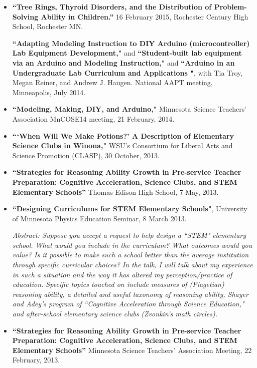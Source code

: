 \documentclass[margin,line,letterpaper]{res}
\begin{document}
\begin{resume}
\begin{itemize}
\item
\textbf{``Tree Rings, Thyroid Disorders, and the Distribution of Problem-Solving Ability in Children.''}
16 February 2015, Rochester Century High School, Rochester MN.

\textbf{``Adapting Modeling Instruction to DIY Arduino (microcontroller) Lab Equipment Development,"} and \textbf{``Student-built lab equipment via an Arduino and Modeling Instruction,"} and \textbf{``Arduino in an Undergraduate Lab Curriculum and Applications
"}, with Tia Troy, Megan Reiner, and Andrew J. Haugen.  
National AAPT meeting, Minneapolis, July 2014.

\item
\textbf{``Modeling, Making, DIY, and Arduino,"}
Minnesota Science Teachers' Association MnCOSE14 meeting, 21 February, 2014.  

\item
\textbf{```When Will We Make Potions?' A Description of Elementary Science Clubs in Winona,"}
WSU's Consortium for Liberal Arts and Science Promotion (CLASP), 30 October, 2013.

\item \textbf{``Strategies for Reasoning Ability Growth in Pre-service Teacher Preparation: Cognitive Acceleration, Science Clubs, and STEM Elementary Schools''}
Thomas Edison High School, 7 May, 2013.

\item \textbf{``Designing Curriculums for STEM Elementary Schools"}, University of Minnesota Physics Education Seminar, 8 March 2013.

\textit{Abstract: Suppose you accept a request to help design a ``STEM" elementary school. What would you include in the curriculum? What outcomes would you value? Is it possible to make such a school better than the average institution through specific curricular choices? In the talk, I will talk about my experience in such a situation and the way it has altered my perception/practice of education. Specific topics touched on include measures of (Piagetian) reasoning ability, a detailed and useful taxonomy of reasoning ability, Shayer and Adey's program of ``Cognitive Acceleration through Science Education," and after-school elementary science clubs (Zvonkin's math circles).}

\item \textbf{``Strategies for Reasoning Ability Growth in Pre-service Teacher Preparation: Cognitive Acceleration, Science Clubs, and STEM Elementary Schools''}
Minnesota Science Teachers' Association Meeting, 22 February, 2013. 
 

\end{itemize}
\end{resume}
\end{document}
